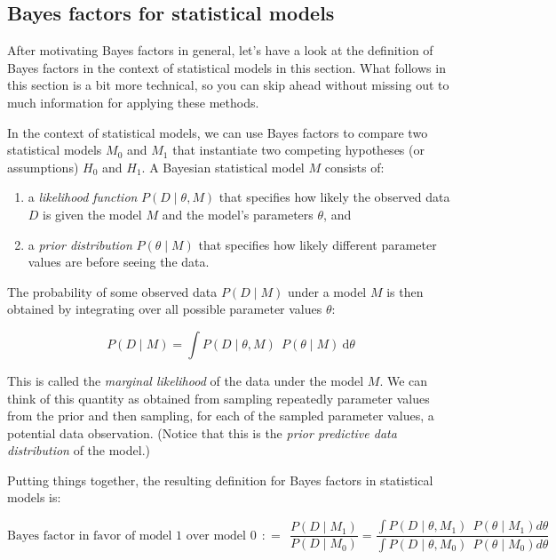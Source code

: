 \documentclass[
  doc,
  floatsintext,
  longtable,
  nolmodern,
  notxfonts,
  notimes,
  colorlinks=true,linkcolor=blue,citecolor=blue,urlcolor=blue]{apa7}
\providecommand{\tightlist}{%
  \setlength{\itemsep}{0pt}\setlength{\parskip}{0pt}}
\begin{document}
\subsection{Bayes factors for statistical
models}\label{bayes-factors-for-statistical-models}

After motivating Bayes factors in general, let's have a look at the
definition of Bayes factors in the context of statistical models in this
section. What follows in this section is a bit more technical, so you
can skip ahead without missing out to much information for applying
these methods.

In the context of statistical models, we can use Bayes factors to
compare two statistical models \(M_0\) and \(M_1\) that instantiate two
competing hypotheses (or assumptions) \(H_0\) and \(H_1\). A Bayesian
statistical model \(M\) consists of:

\begin{enumerate}
\def\labelenumi{\arabic{enumi}.}
\tightlist
\item
  a \emph{likelihood function} \(P(D \mid \theta, M)\) that specifies
  how likely the observed data \(D\) is given the model \(M\) and the
  model's parameters \(\theta\), and
\item
  a \emph{prior distribution} \(P(\theta \mid M)\) that specifies how
  likely different parameter values are before seeing the data.
\end{enumerate}

The probability of some observed data \(P(D \mid M)\) under a model
\(M\) is then obtained by integrating over all possible parameter values
\(\theta\):

\[
P(D \mid M) = \int P(D \mid \theta, M) \ \  P(\theta \mid M) \ \text{d} \theta
\]

This is called the \emph{marginal likelihood} of the data under the
model \(M\). We can think of this quantity as obtained from sampling
repeatedly parameter values from the prior and then sampling, for each
of the sampled parameter values, a potential data observation. (Notice
that this is the \emph{prior predictive data distribution} of the
model.)

Putting things together, the resulting definition for Bayes factors in
statistical models is:

\[
\text{Bayes factor in favor of model 1 over model 0} \ \  \colon\!= \ \ \frac{P(D \mid M_1)}{P(D \mid M_0)} = \frac{\int P(D \mid \theta, M_1) \ \  P(\theta \mid M_1) d\theta}{\int P(D \mid \theta, M_0) \ \  P(\theta \mid M_0) d\theta}
\]
\end{document}
